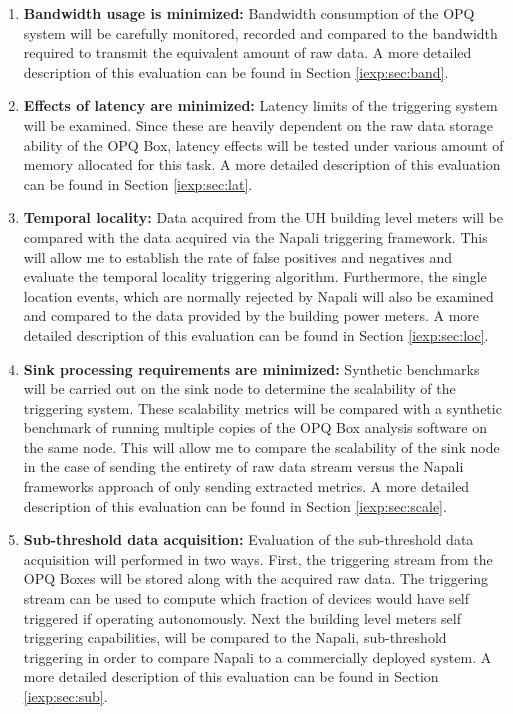 \begin{enumerate}
  \item \textbf{Bandwidth usage is minimized:} Bandwidth consumption of the OPQ system will be carefully monitored, recorded and compared to the bandwidth required to transmit the equivalent amount of raw data.
  A more detailed description of this evaluation can be found in Section \ref{iexp:sec:band}.
    
	\item \textbf{Effects of latency are minimized:}  Latency limits of the triggering system will be examined.
	Since these are heavily dependent on the raw data storage ability of the OPQ Box, latency effects will be tested under various amount of memory allocated for this task.
	A more detailed description of this evaluation can be found in Section \ref{iexp:sec:lat}.
  
  \item \textbf{Temporal locality:} Data acquired from the UH building level meters will be compared with the data acquired via the Napali triggering framework.
   This will allow me to establish the rate of false positives and negatives and evaluate the temporal locality triggering algorithm.
   Furthermore, the single location events, which are normally rejected by Napali will also be examined and compared to the data provided by the building power meters.
   A more detailed description of this evaluation can be found in Section \ref{iexp:sec:loc}.

  \item \textbf{Sink processing requirements are minimized:} Synthetic benchmarks will be carried out on the sink node to determine the scalability of the triggering system.
  These scalability metrics will be compared with a synthetic benchmark of running multiple copies of the OPQ Box analysis software on the same node.
  This will allow me to compare the scalability of the sink node in the case of sending the entirety of raw data stream versus the Napali frameworks approach of only sending extracted metrics.
  A more detailed description of this evaluation can be found in Section \ref{iexp:sec:scale}.

	\item \textbf{Sub-threshold data acquisition:} Evaluation of the sub-threshold data acquisition will performed in two ways.
	First, the triggering stream from the OPQ Boxes will be stored along with the acquired raw data.
	The triggering stream can be used to compute which fraction of devices would have self triggered if operating autonomously.
	Next the building level meters self triggering capabilities, will be compared to the Napali, sub-threshold triggering in order to compare Napali to a commercially deployed system.
	A more detailed description of this evaluation can be found in Section \ref{iexp:sec:sub}.
  
\end{enumerate}
